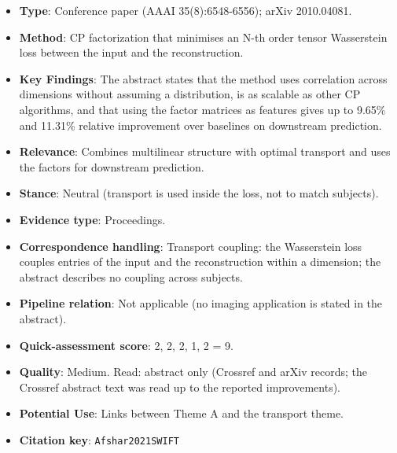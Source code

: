 \documentclass[journal,onecolumn]{IEEEtran}
\begin{document}
\begin{itemize}

\item{} \textbf{Type}: Conference paper (AAAI 35(8):6548-6556); arXiv 2010.04081.

\item{} \textbf{Method}: CP factorization that minimises an N-th order tensor Wasserstein loss between the input and the reconstruction.

\item{} \textbf{Key Findings}: The abstract states that the method uses correlation across dimensions without assuming a distribution, is as scalable as other CP algorithms, and that using the factor matrices as features gives up to 9.65\% and 11.31\% relative improvement over baselines on downstream prediction.

\item{} \textbf{Relevance}: Combines multilinear structure with optimal transport and uses the factors for downstream prediction.

\item{} \textbf{Stance}: Neutral (transport is used inside the loss, not to match subjects).

\item{} \textbf{Evidence type}: Proceedings.

\item{} \textbf{Correspondence handling}: Transport coupling: the Wasserstein loss couples entries of the input and the reconstruction within a dimension; the abstract describes no coupling across subjects.

\item{} \textbf{Pipeline relation}: Not applicable (no imaging application is stated in the abstract).

\item{} \textbf{Quick-assessment score}: 2, 2, 2, 1, 2 = 9.

\item{} \textbf{Quality}: Medium. Read: abstract only (Crossref and arXiv records; the Crossref abstract text was read up to the reported improvements).

\item{} \textbf{Potential Use}: Links between Theme A and the transport theme.

\item{} \textbf{Citation key}: \texttt{Afshar2021SWIFT}

\end{itemize}
\end{document}
